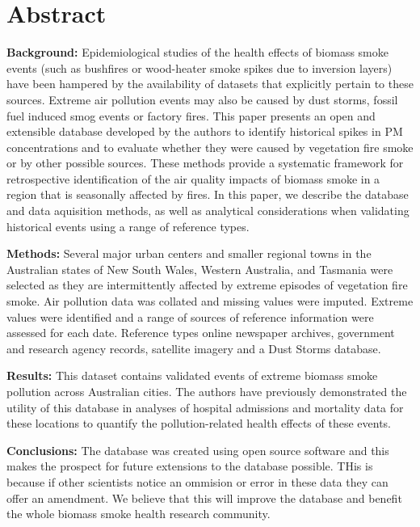 


\section{Abstract}\label{abstract}

\textbf{Background:} Epidemiological studies of the health effects of
biomass smoke events (such as bushfires or wood-heater smoke spikes due
to inversion layers) have been hampered by the availability of datasets
that explicitly pertain to these sources. Extreme air pollution events
may also be caused by dust storms, fossil fuel induced smog events or
factory fires. This paper presents an open and extensible database
developed by the authors to identify historical spikes in PM
concentrations and to evaluate whether they were caused by vegetation
fire smoke or by other possible sources. These methods provide a
systematic framework for retrospective identification of the air quality
impacts of biomass smoke in a region that is seasonally affected by
fires. In this paper, we describe the database and data aquisition
methods, as well as analytical considerations when validating historical
events using a range of reference types.

\textbf{Methods:} Several major urban centers and smaller regional towns
in the Australian states of New South Wales, Western Australia, and
Tasmania were selected as they are intermittently affected by extreme
episodes of vegetation fire smoke. Air pollution data was collated and
missing values were imputed. Extreme values were identified and a range
of sources of reference information were assessed for each date.
Reference types online newspaper archives, government and research
agency records, satellite imagery and a Dust Storms database.

\textbf{Results:} This dataset contains validated events of extreme
biomass smoke pollution across Australian cities. The authors have
previously demonstrated the utility of this database in analyses of
hospital admissions and mortality data for these locations to quantify
the pollution-related health effects of these events.

\textbf{Conclusions:} The database was created using open source
software and this makes the prospect for future extensions to the
database possible. THis is because if other scientists notice an
ommision or error in these data they can offer an amendment. We believe
that this will improve the database and benefit the whole biomass smoke
health research community.

